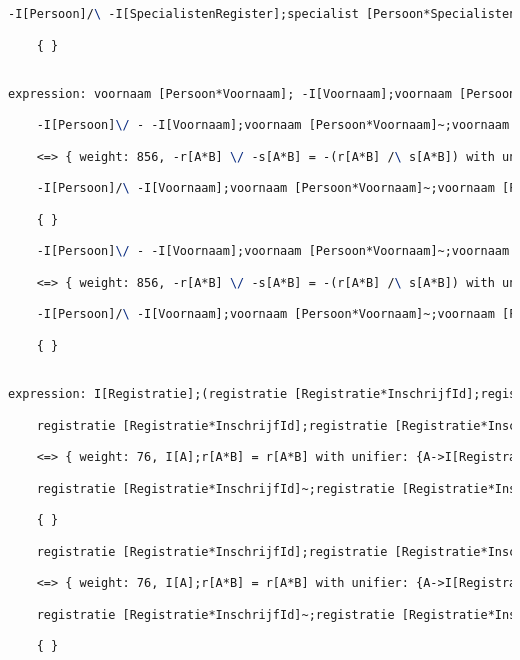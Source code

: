 \begin{lstlisting}[language=TeX]
    -I[Persoon]/\ -I[SpecialistenRegister];specialist [Persoon*SpecialistenRegister]~;specialist [Persoon*SpecialistenRegister]

    { }


expression: voornaam [Persoon*Voornaam]; -I[Voornaam];voornaam [Persoon*Voornaam]~ |- -I[Persoon]

    -I[Persoon]\/ - -I[Voornaam];voornaam [Persoon*Voornaam]~;voornaam [Persoon*Voornaam]

    <=> { weight: 856, -r[A*B] \/ -s[A*B] = -(r[A*B] /\ s[A*B]) with unifier: {A->I[Persoon], B->I[Persoon], r->voornaam [Persoon*Voornaam];-I[Voornaam];voornaam [Persoon*Voornaam]~, s->I[Persoon]} }

    -I[Persoon]/\ -I[Voornaam];voornaam [Persoon*Voornaam]~;voornaam [Persoon*Voornaam]

    { }

    -I[Persoon]\/ - -I[Voornaam];voornaam [Persoon*Voornaam]~;voornaam [Persoon*Voornaam]

    <=> { weight: 856, -r[A*B] \/ -s[A*B] = -(r[A*B] /\ s[A*B]) with unifier: {A->I[Persoon], B->I[Persoon], r->I[Persoon], s->voornaam [Persoon*Voornaam];-I[Voornaam];voornaam [Persoon*Voornaam]~} }

    -I[Persoon]/\ -I[Voornaam];voornaam [Persoon*Voornaam]~;voornaam [Persoon*Voornaam]

    { }


expression: I[Registratie];(registratie [Registratie*InschrijfId];registratie [Registratie*InschrijfId]~)

    registratie [Registratie*InschrijfId];registratie [Registratie*InschrijfId]~;I[Registratie]

    <=> { weight: 76, I[A];r[A*B] = r[A*B] with unifier: {A->I[Registratie], B->I[Registratie], r->registratie [Registratie*InschrijfId];registratie [Registratie*InschrijfId]~} }

    registratie [Registratie*InschrijfId]~;registratie [Registratie*InschrijfId]

    { }

    registratie [Registratie*InschrijfId];registratie [Registratie*InschrijfId]~;I[Registratie]

    <=> { weight: 76, I[A];r[A*B] = r[A*B] with unifier: {A->I[Registratie], B->I[InschrijfId], r->registratie [Registratie*InschrijfId]} }

    registratie [Registratie*InschrijfId]~;registratie [Registratie*InschrijfId]

    { }



\end{lstlisting}

